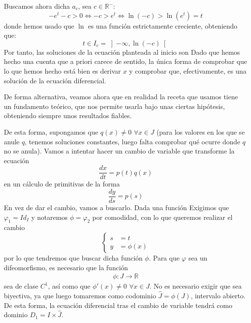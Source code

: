 \begin{ejemplo}
\begin{itemize}
    \end{itemize}
    Buscamos ahora dicha $a_c$, sea $c\in \mathbb{R}^-$:
    \begin{equation*}
        -e^t -c > 0 \Longleftrightarrow -c > e^t \Longleftrightarrow \ln(-c) > \ln (e^t) = t
    \end{equation*}
    donde hemos usado que $\ln$ es una función estrictamente creciente, obteniendo que:
    \begin{equation*}
        t\in I_c = \left]-\infty, \ln(-c)\right[
    \end{equation*}
    Por tanto, las soluciones de la ecuación planteada al inicio son
    Dado que hemos hecho una cuenta que a priori carece de sentido, la única forma de comprobar que lo que hemos hecho está bien es derivar $x$ y comprobar que, efectivamente, es una solución de la ecuación diferencial.

    De forma alternativa, veamos ahora que en realidad la receta que usamos tiene un fundamento teórico, que nos permite usarla bajo unas ciertas hipótesis, obteniendo siempre unos resultados fiables.
\end{ejemplo}

De esta forma, supongamos que $q(x)\neq 0$ $\forall x\in J$ (para los valores en los que se anule $q$, tenemos soluciones constantes, luego falta comprobar qué ocurre donde $q$ no se anula).
Vamos a intentar hacer un cambio de variable que transforme la ecuación
\begin{equation}\label{eq:variables_separadas}
    \dfrac{dx}{dt} = p(t)q(x)
\end{equation}
en un cálculo de primitivas de la forma 
\begin{equation}\label{eq:variables_separadas_resultado}
    \dfrac{dy}{ds} = p(s)
\end{equation}
En vez de dar el cambio, vamos a buscarlo. Dada una función
Exigimos que $\varphi_1 = Id_I$ y notaremos $\phi = \varphi_2$ por comodidad, con lo que queremos realizar el cambio
\begin{equation}\label{eq:cambio_var}
    \left\{\begin{array}{rl}
            s &= t \\
            y &= \phi(x)
    \end{array}\right.
\end{equation}
por lo que tendremos que buscar dicha función $\phi$. Para que $\varphi$ sea un difeomorfismo, es necesario que la función
\begin{gather*}
    \phi:J\rightarrow\mathbb{R}
\end{gather*}
sea de clase $C^1$, así como que $\phi'(x)\neq 0$ $\forall x\in J$. No es necesario exigir que sea biyectiva, ya que luego tomaremos como codominio $\hat{J} = \phi(J)$, intervalo abierto.\\
De esta forma, la ecuación diferencial tras el cambio de variable tendrá como dominio $D_1=I\times \hat{J}$.\\

